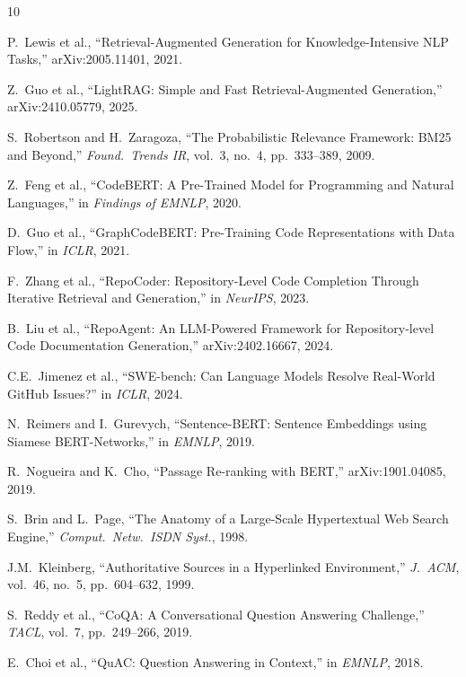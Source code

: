 \documentclass[conference]{IEEEtran}
\begin{document}
\begin{thebibliography}{10}

P.~Lewis et al., ``Retrieval-Augmented Generation for Knowledge-Intensive NLP Tasks,'' arXiv:2005.11401, 2021.

Z.~Guo et al., ``LightRAG: Simple and Fast Retrieval-Augmented Generation,'' arXiv:2410.05779, 2025.

S.~Robertson and H.~Zaragoza, ``The Probabilistic Relevance Framework: BM25 and Beyond,''
\textit{Found.\ Trends IR}, vol.~3, no.~4, pp.~333--389, 2009.

Z.~Feng et al., ``CodeBERT: A Pre-Trained Model for Programming and Natural Languages,''
in \textit{Findings of EMNLP}, 2020.

D.~Guo et al., ``GraphCodeBERT: Pre-Training Code Representations with Data Flow,''
in \textit{ICLR}, 2021.

F.~Zhang et al., ``RepoCoder: Repository-Level Code Completion Through Iterative Retrieval and Generation,''
in \textit{NeurIPS}, 2023.

B.~Liu et al., ``RepoAgent: An LLM-Powered Framework for Repository-level Code Documentation Generation,''
arXiv:2402.16667, 2024.

C.E.~Jimenez et al., ``SWE-bench: Can Language Models Resolve Real-World GitHub Issues?''
in \textit{ICLR}, 2024.

N.~Reimers and I.~Gurevych, ``Sentence-BERT: Sentence Embeddings using Siamese BERT-Networks,''
in \textit{EMNLP}, 2019.

R.~Nogueira and K.~Cho, ``Passage Re-ranking with BERT,'' arXiv:1901.04085, 2019.

S.~Brin and L.~Page, ``The Anatomy of a Large-Scale Hypertextual Web Search Engine,''
\textit{Comput.\ Netw.\ ISDN Syst.}, 1998.

J.M.~Kleinberg, ``Authoritative Sources in a Hyperlinked Environment,''
\textit{J.\ ACM}, vol.~46, no.~5, pp.~604--632, 1999.

S.~Reddy et al., ``CoQA: A Conversational Question Answering Challenge,''
\textit{TACL}, vol.~7, pp.~249--266, 2019.

E.~Choi et al., ``QuAC: Question Answering in Context,'' in \textit{EMNLP}, 2018.


\end{thebibliography}
\end{document}
